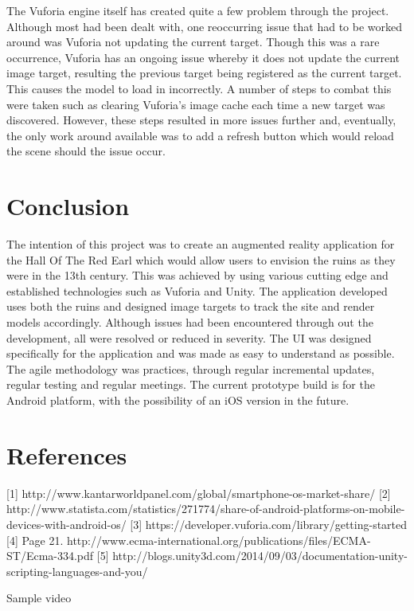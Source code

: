 The Vuforia engine itself has created quite a few problem through the project. Although most had been dealt with, one reoccurring issue that had to be worked around was Vuforia not updating the current target. Though this was a rare occurrence, Vuforia has an ongoing issue whereby it does not update the current image target, resulting the previous target being registered as the current target. This causes the model to load in incorrectly. A number of steps to combat this were taken such as clearing Vuforia's image cache each time a new target was discovered. However, these steps resulted in more issues further and, eventually, the only work around available was to add a refresh button which would reload the scene should the issue occur.

\chapter{Conclusion}
The intention of this project was to create an augmented reality application for the Hall Of The Red Earl which would allow users to envision the ruins as they were in the 13th century. This was achieved by using various cutting edge and established technologies such as Vuforia and Unity.
The application developed uses both the ruins and designed image targets to track the site and render models accordingly. Although issues had been encountered through out the development, all were resolved or reduced in severity. The UI was designed specifically for the application and was made as easy to understand as possible. The agile methodology was practices, through regular incremental updates, regular testing and regular meetings. The current prototype build is for the Android platform, with the possibility of an iOS version in the future.

\chapter{References}
[1] http://www.kantarworldpanel.com/global/smartphone-os-market-share/
[2] http://www.statista.com/statistics/271774/share-of-android-platforms-on-mobile-devices-with-android-os/
[3] https://developer.vuforia.com/library/getting-started
[4] Page 21. http://www.ecma-international.org/publications/files/ECMA-ST/Ecma-334.pdf 
[5] http://blogs.unity3d.com/2014/09/03/documentation-unity-scripting-languages-and-you/

Sample video


